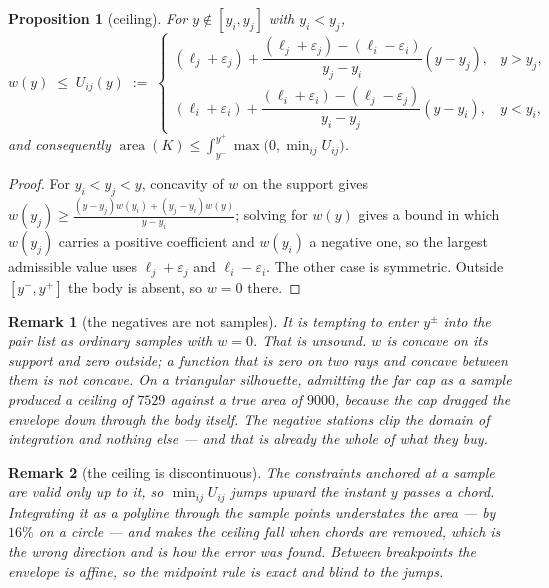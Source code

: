 \documentclass[11pt]{article}
\newtheorem{proposition}{Proposition}
\newtheorem*{remark}{Remark}
\begin{document}
\begin{proposition}[ceiling]\label{prop:ceiling}
For $y\notin[y_i,y_j]$ with $y_i<y_j$,
\begin{equation}
w(y)\;\le\;U_{ij}(y)\;:=\;
\begin{cases}
(\ell_j+\varepsilon_j)+\dfrac{(\ell_j+\varepsilon_j)-(\ell_i-\varepsilon_i)}{y_j-y_i}(y-y_j), & y>y_j,\\[2ex]
(\ell_i+\varepsilon_i)+\dfrac{(\ell_i+\varepsilon_i)-(\ell_j-\varepsilon_j)}{y_i-y_j}(y-y_i), & y<y_i,
\end{cases}
\end{equation}
and consequently
$\operatorname{area}(K)\le\int_{y^-}^{y^+}\max\!\big(0,\min_{ij}U_{ij}\big)$.
\end{proposition}

\begin{proof}
For $y_i<y_j<y$, concavity of $w$ on the support gives
$w(y_j)\ge\frac{(y-y_j)w(y_i)+(y_j-y_i)w(y)}{y-y_i}$; solving for $w(y)$ gives a
bound in which $w(y_j)$ carries a positive coefficient and $w(y_i)$ a negative
one, so the largest admissible value uses $\ell_j+\varepsilon_j$ and
$\ell_i-\varepsilon_i$. The other case is symmetric. Outside $[y^-,y^+]$ the
body is absent, so $w=0$ there.
\end{proof}

\begin{remark}[the negatives are not samples]
It is tempting to enter $y^\pm$ into the pair list as ordinary samples with
$w=0$. That is unsound. $w$ is concave \emph{on its support} and zero outside;
a function that is zero on two rays and concave between them is not concave. On
a triangular silhouette, admitting the far cap as a sample produced a ceiling of
$7529$ against a true area of $9000$, because the cap dragged the envelope down
through the body itself. The negative stations clip the domain of integration
and nothing else --- and that is already the whole of what they buy.
\end{remark}

\begin{remark}[the ceiling is discontinuous]
The constraints anchored at a sample are valid only up to it, so
$\min_{ij}U_{ij}$ jumps upward the instant $y$ passes a chord. Integrating it as
a polyline through the sample points understates the area --- by $16\%$ on a
circle --- and makes the ceiling \emph{fall} when chords are removed, which is
the wrong direction and is how the error was found. Between breakpoints the
envelope is affine, so the midpoint rule is exact and blind to the jumps.
\end{remark}
\end{document}
